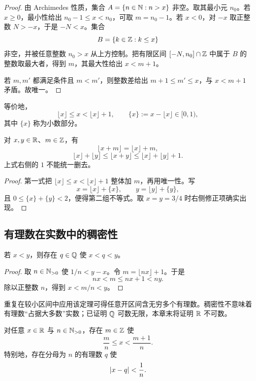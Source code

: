 \begin{proof}
由 Archimedes 性质，集合 \(A=\{n\in\mathbb{N}:n>x\}\) 非空。取其最小元 \(n_0\)。若 \(x\ge0\)，最小性给出 \(n_0-1\le x<n_0\)，可取 \(m=n_0-1\)。若 \(x<0\)，对 \(-x\) 取正整数 \(N>-x\)，于是 \(-N<x\)。集合
\[
 B=\{k\in\mathbb{Z}:k\le x\}
\]
非空，并被任意整数 \(n_0>x\) 从上方控制。把有限区间 \([-N,n_0]\cap\mathbb{Z}\) 中属于 \(B\) 的整数取最大者，得到 \(m\)，其最大性给出 \(x<m+1\)。

若 \(m,m'\) 都满足条件且 \(m<m'\)，则整数差给出 \(m+1\le m'\le x\)，与 \(x<m+1\) 矛盾。故唯一。
\end{proof}

等价地，
\[
 \lfloor x\rfloor\le x<\lfloor x\rfloor+1,\qquad
 \{x\}:=x-\lfloor x\rfloor\in[0,1),
\]
其中 \(\{x\}\) 称为小数部分。

\begin{proposition}[整数部分的基本运算]
对 \(x,y\in\mathbb{R}\)、\(m\in\mathbb{Z}\)，有
\[
 \lfloor x+m\rfloor=\lfloor x\rfloor+m,
\]
\[
 \lfloor x\rfloor+\lfloor y\rfloor
 \le\lfloor x+y\rfloor
 \le\lfloor x\rfloor+\lfloor y\rfloor+1.
\]
上式右侧的 \(1\) 不能统一删去。
\end{proposition}

\begin{proof}
第一式把
\(\lfloor x\rfloor\le x<\lfloor x\rfloor+1\)
整体加 \(m\)，再用唯一性。写
\[
 x=\lfloor x\rfloor+\{x\},\qquad
 y=\lfloor y\rfloor+\{y\},
\]
且 \(0\le\{x\}+\{y\}<2\)，便得第二组不等式。取 \(x=y=3/4\) 时右侧修正项确实出现。
\end{proof}

\subsection{有理数在实数中的稠密性}


\begin{theorem}
若 \(x<y\)，则存在 \(q\in\mathbb{Q}\) 使 \(x<q<y\)。
\end{theorem}

\begin{proof}
取 \(n\in\mathbb{N}_{>0}\) 使 \(1/n<y-x\)。令 \(m=\lfloor nx\rfloor+1\)。于是
\[
 nx<m\le nx+1<ny.
\]
除以正整数 \(n\)，得到 \(x<m/n<y\)。
\end{proof}

重复在较小区间中应用该定理可得任意开区间含无穷多个有理数。稠密性不意味着有理数“占据大多数”实数；已证明 \(\mathbb{Q}\) 可数无限，本章末将证明 \(\mathbb{R}\) 不可数。

\begin{proposition}[定量有理逼近]
对任意 \(x\in\mathbb{R}\) 与 \(n\in\mathbb{N}_{>0}\)，存在 \(m\in\mathbb{Z}\) 使
\[
 \frac mn\le x<\frac{m+1}{n}.
\]
特别地，存在分母为 \(n\) 的有理数 \(q\) 使
\[
 \left|x-q\right|<\frac1n.
\]
\end{proposition}

